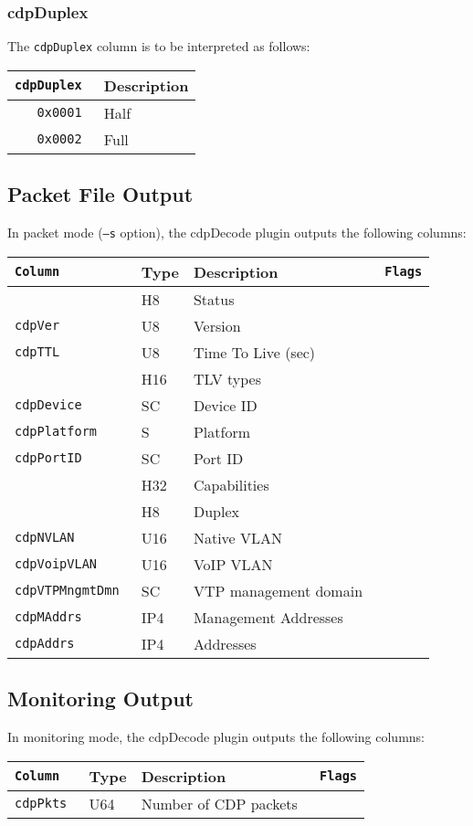 \documentclass[documentation]{subfiles}
\begin{document}
\subsubsection{cdpDuplex}\label{cdpDuplex}
The {\tt cdpDuplex} column is to be interpreted as follows:
\begin{longtable}{>{\tt}rl}
    \toprule
    {\bf cdpDuplex} & {\bf Description}\\
    \midrule\endhead%
    0x0001 & Half\\
    0x0002 & Full\\
    \bottomrule
\end{longtable}

\subsection{Packet File Output}
In packet mode ({\tt --s} option), the cdpDecode plugin outputs the following columns:
\begin{longtable}{>{\tt}lll>{\tt\small}l}
    \toprule
    {\bf Column} & {\bf Type} & {\bf Description} & {\bf Flags}\\
    \midrule\endhead%
    \nameref{cdpStat}     & H8  & Status\\
    cdpVer                & U8  & Version\\
    cdpTTL                & U8  & Time To Live (sec)\\
    \nameref{cdpTLVTypes} & H16 & TLV types\\
    cdpDevice             & SC  & Device ID\\
    cdpPlatform           & S   & Platform\\
    cdpPortID             & SC  & Port ID\\
    \nameref{cdpCaps}     & H32 & Capabilities\\
    \nameref{cdpDuplex}   & H8  & Duplex\\
    cdpNVLAN              & U16 & Native VLAN\\
    cdpVoipVLAN           & U16 & VoIP VLAN\\
    cdpVTPMngmtDmn        & SC  & VTP management domain\\
    cdpMAddrs             & IP4 & Management Addresses\\
    cdpAddrs              & IP4 & Addresses\\
    \bottomrule
\end{longtable}

\subsection{Monitoring Output}
In monitoring mode, the cdpDecode plugin outputs the following columns:
\begin{longtable}{>{\tt}lll>{\tt\small}l}
    \toprule
    {\bf Column} & {\bf Type} & {\bf Description}     & {\bf Flags}\\
    \midrule\endhead%
    cdpPkts      & U64        & Number of CDP packets & \\
    \bottomrule
\end{longtable}
\end{document}
